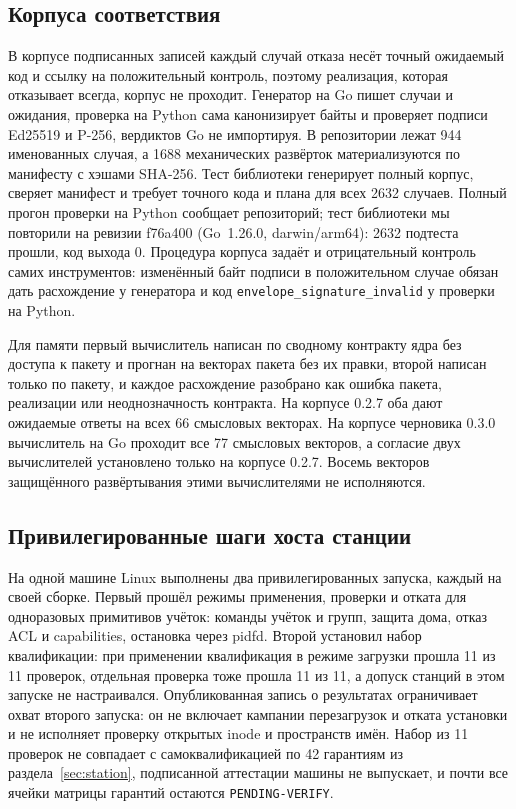 \documentclass[10pt,a4paper]{article}
\newcommand{\measured}[1]{#1}
\begin{document}
\subsection{Корпуса соответствия}

В корпусе подписанных записей каждый случай отказа несёт точный ожидаемый код и ссылку на положительный контроль, поэтому реализация, которая отказывает всегда, корпус не проходит. Генератор на Go пишет случаи и ожидания, проверка на Python сама канонизирует байты и проверяет подписи Ed25519 и P-256, вердиктов Go не импортируя. В репозитории лежат 944 именованных случая, а 1688 механических развёрток материализуются по манифесту с хэшами SHA-256. Тест библиотеки генерирует полный корпус, сверяет манифест и требует точного кода и плана для всех 2632 случаев. Полный прогон проверки на Python сообщает репозиторий; тест библиотеки мы повторили на ревизии f76a400 (Go~1.26.0, darwin/arm64): 2632 подтеста прошли, код выхода 0. Процедура корпуса задаёт и отрицательный контроль самих инструментов: изменённый байт подписи в положительном случае обязан дать расхождение у генератора и код \texttt{envelope\_signature\_invalid} у проверки на Python.

Для памяти первый вычислитель написан по сводному контракту ядра без доступа к пакету и прогнан на векторах пакета без их правки, второй написан только по пакету, и каждое расхождение разобрано как ошибка пакета, реализации или неоднозначность контракта. На корпусе 0.2.7 оба дают ожидаемые ответы на всех 66 смысловых векторах. На корпусе черновика 0.3.0 вычислитель на Go проходит все 77 смысловых векторов, а согласие двух вычислителей установлено только на корпусе 0.2.7. Восемь векторов защищённого развёртывания этими вычислителями не исполняются.

\subsection{Привилегированные шаги хоста станции}

На одной машине Linux выполнены два привилегированных запуска, каждый на своей сборке. Первый прошёл режимы применения, проверки и отката для одноразовых примитивов учёток: команды учёток и групп, защита дома, отказ ACL и capabilities, остановка через pidfd. Второй установил набор квалификации: при применении квалификация в режиме загрузки прошла 11 из 11 проверок, отдельная проверка тоже прошла 11 из 11, а допуск станций в этом запуске \measured{не настраивался}. Опубликованная запись о результатах ограничивает охват второго запуска: он не включает кампании перезагрузок и отката установки и не исполняет проверку открытых inode и пространств имён. Набор из 11 проверок не совпадает с самоквалификацией по 42 гарантиям из раздела~\ref{sec:station}, подписанной аттестации машины не выпускает, и почти все ячейки матрицы гарантий остаются \texttt{PENDING-VERIFY}.
\end{document}
